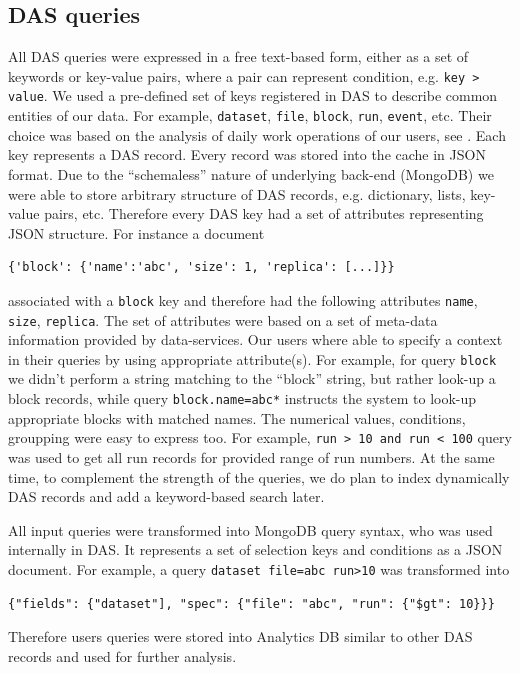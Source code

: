 \documentclass[1p,times]{elsarticle}
\begin{document}
\subsection{DAS queries}
All DAS queries were expressed in a free text-based form, either as a 
set of keywords or key-value pairs, where a pair can represent
condition, e.g. \verb+key > value+. We used a pre-defined set of keys registered 
in DAS to describe common entities of our data. For example, \verb+dataset+, 
\verb+file+, \verb+block+, \verb+run+, \verb+event+, etc. Their choice
was based on the analysis of daily work operations of our users, see \cite{DBS07}.
Each key represents a DAS record. Every record was stored into the cache
in JSON format. Due to the ``schemaless'' nature of underlying back-end (MongoDB)
we were able to store arbitrary structure of DAS records, e.g.
dictionary, lists, key-value pairs, etc. Therefore every DAS key had a 
set of attributes representing JSON structure. For instance a document
\begin{verbatim}
{'block': {'name':'abc', 'size': 1, 'replica': [...]}}
\end{verbatim}
associated with a \verb+block+ key and therefore had the following attributes
\verb+name+, \verb+size+, \verb+replica+. The set of attributes were based 
on a set of meta-data information provided by data-services. Our users 
where able to specify a context in their queries by using appropriate 
attribute(s). For example, for query \verb+block+ we didn't perform a string 
matching to the ``block'' string, but rather look-up a block records, while query
\verb+block.name=abc*+ instructs the system to look-up appropriate blocks
with matched names. The numerical values, conditions, groupping were
easy to express too. For example, \verb+run > 10 and run < 100+ query 
was used to get all run records for provided range of run numbers. 
At the same time, to complement the strength of the queries, we do plan 
to index dynamically DAS records and add a keyword-based 
search later.

All input queries were transformed into MongoDB query syntax, 
who was used internally in DAS. It represents a set of selection 
keys and conditions as a JSON document. For example, a query
\verb+dataset file=abc run>10+
was transformed into 
\begin{verbatim}
{"fields": {"dataset"], "spec": {"file": "abc", "run": {"$gt": 10}}}
\end{verbatim}
Therefore users queries were stored into Analytics DB similar to other DAS 
records and used for further analysis.
\end{document}
